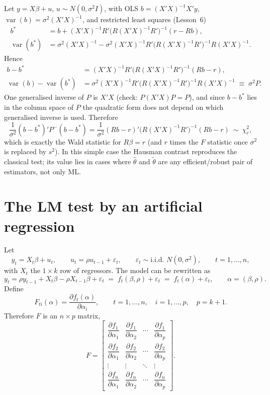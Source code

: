 \documentclass[11pt]{article}
\begin{document}
Let $y=X\beta+u$, $u\sim N(0,\sigma^{2}I)$, with OLS $b=(X'X)^{-1}X'y$, $\operatorname{var}(b)=\sigma^{2}(X'X)^{-1}$, and
restricted least squares (Lesson~6)
\begin{align*}
 b^{*}&=b+(X'X)^{-1}R'\bigl(R(X'X)^{-1}R'\bigr)^{-1}(r-Rb),\\
 \operatorname{var}(b^{*})&=\sigma^{2}(X'X)^{-1}-\sigma^{2}(X'X)^{-1}R'\bigl(R(X'X)^{-1}R'\bigr)^{-1}R(X'X)^{-1}.
\end{align*}
Hence
\begin{align*}
 b-b^{*}&=(X'X)^{-1}R'\bigl(R(X'X)^{-1}R'\bigr)^{-1}(Rb-r),\\
 \operatorname{var}(b)-\operatorname{var}(b^{*})&=\sigma^{2}(X'X)^{-1}R'\bigl(R(X'X)^{-1}R'\bigr)^{-1}R(X'X)^{-1}
 \;\equiv\;\sigma^{2}P .
\end{align*}
One generalised inverse of $P$ is $X'X$ (check: $P(X'X)P=P$), and since $b-b^{*}$ lies in the column space
of $P$ the quadratic form does not depend on which generalised inverse is used. Therefore
\[ \frac1{\sigma^{2}}(b-b^{*})'P^{-}(b-b^{*})
   =\frac1{\sigma^{2}}(Rb-r)'\bigl(R(X'X)^{-1}R'\bigr)^{-1}(Rb-r)\ \sim\ \chi^{2}_{r}, \]
which is exactly the Wald statistic for $R\beta=r$ (and $r$ times the $F$ statistic once $\sigma^{2}$ is replaced
by $s^{2}$). In this simple case the Hausman contrast reproduces the classical test; its value lies in
cases where $\hat\theta$ and $\tilde\theta$ are any efficient/robust pair of estimators, not only ML.

\section{The LM test by an artificial regression}

Let
\[ y_{t}=X_{t}\beta+u_{t},\qquad u_{t}=\rho u_{t-1}+\varepsilon_{t},\qquad \varepsilon_{t}\sim\text{i.i.d. }N(0,\sigma^{2}),\qquad t=1,\dots,n, \]
with $X_{t}$ the $1\times k$ row of regressors. The model can be rewritten as
\[ y_{t}=\rho y_{t-1}+X_{t}\beta-\rho X_{t-1}\beta+\varepsilon_{t}
   \;=\;f_{t}(\beta,\rho)+\varepsilon_{t}\;=\;f_{t}(\alpha)+\varepsilon_{t},\qquad\alpha=(\beta,\rho). \]
Define
\[ F_{ti}(\alpha)=\frac{\partial f_{t}(\alpha)}{\partial\alpha_{i}},\qquad t=1,\dots,n,\quad i=1,\dots,p,\quad p=k+1. \]
Therefore $F$ is an $n\times p$ matrix,
\[ F=\begin{bmatrix}
 \dfrac{\partial f_{1}}{\partial\alpha_{1}}&\dfrac{\partial f_{1}}{\partial\alpha_{2}}&\cdots&\dfrac{\partial f_{1}}{\partial\alpha_{p}}\\[8pt]
 \dfrac{\partial f_{2}}{\partial\alpha_{1}}&\dfrac{\partial f_{2}}{\partial\alpha_{2}}&\cdots&\dfrac{\partial f_{2}}{\partial\alpha_{p}}\\[4pt]
 \vdots&\vdots&\ddots&\vdots\\[2pt]
 \dfrac{\partial f_{n}}{\partial\alpha_{1}}&\dfrac{\partial f_{n}}{\partial\alpha_{2}}&\cdots&\dfrac{\partial f_{n}}{\partial\alpha_{p}}
\end{bmatrix}. \]
\end{document}
